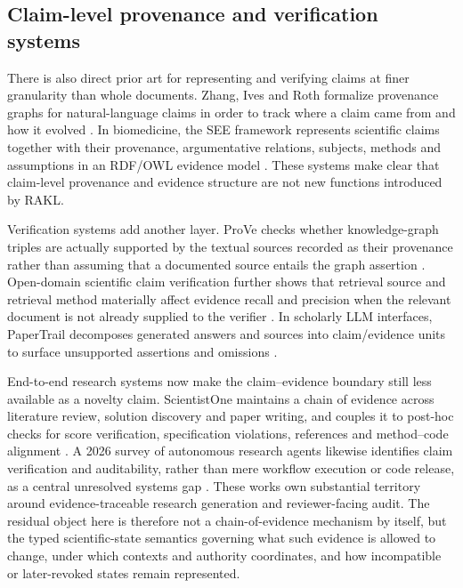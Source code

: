 \subsection{Claim-level provenance and verification systems}

There is also direct prior art for representing and verifying claims at finer granularity than whole documents. Zhang, Ives and Roth formalize provenance graphs for natural-language claims in order to track where a claim came from and how it evolved \cite{zhang2020claim}. In biomedicine, the SEE framework represents scientific claims together with their provenance, argumentative relations, subjects, methods and assumptions in an RDF/OWL evidence model \cite{boelling2014see}. These systems make clear that claim-level provenance and evidence structure are not new functions introduced by RAKL.

Verification systems add another layer. ProVe checks whether knowledge-graph triples are actually supported by the textual sources recorded as their provenance rather than assuming that a documented source entails the graph assertion \cite{amaral2024prove}. Open-domain scientific claim verification further shows that retrieval source and retrieval method materially affect evidence recall and precision when the relevant document is not already supplied to the verifier \cite{vladika2024}. In scholarly LLM interfaces, PaperTrail decomposes generated answers and sources into claim/evidence units to surface unsupported assertions and omissions \cite{martinboyle2026}.

End-to-end research systems now make the claim--evidence boundary still less available as a novelty claim. ScientistOne maintains a chain of evidence across literature review, solution discovery and paper writing, and couples it to post-hoc checks for score verification, specification violations, references and method--code alignment \cite{meng2026scientistone}. A 2026 survey of autonomous research agents likewise identifies claim verification and auditability, rather than mere workflow execution or code release, as a central unresolved systems gap \cite{ding2026verificationgap}. These works own substantial territory around evidence-traceable research generation and reviewer-facing audit. The residual object here is therefore not a chain-of-evidence mechanism by itself, but the typed scientific-state semantics governing what such evidence is allowed to change, under which contexts and authority coordinates, and how incompatible or later-revoked states remain represented.

